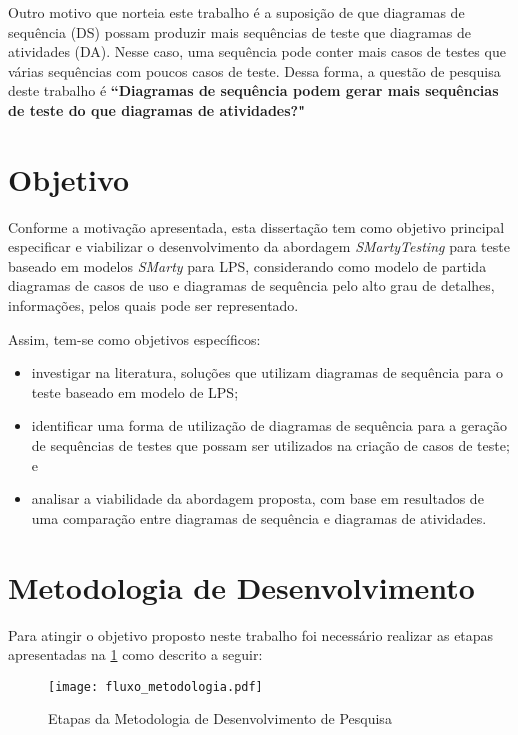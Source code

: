 Outro motivo que norteia este trabalho é a suposição de que diagramas de sequência (DS) possam produzir mais sequências de teste que diagramas de atividades (DA).  Nesse caso, uma sequência pode conter mais casos de testes que várias sequências com poucos casos de teste. Dessa forma, a questão de pesquisa deste trabalho é \textbf{``Diagramas de sequência podem gerar mais sequências de teste do que diagramas de atividades?"} 

\section{Objetivo}
\label{cap1sec:objetivo}

Conforme a motivação apresentada, esta dissertação tem como objetivo principal especificar e viabilizar o desenvolvimento da abordagem \textit{SMartyTesting} para teste baseado em modelos \textit{SMarty} para LPS, considerando como modelo de partida diagramas de casos de uso e diagramas de sequência pelo alto grau de detalhes, informações, pelos quais pode ser representado. 


Assim, tem-se como objetivos específicos:
\begin{itemize}
	\item investigar na literatura, soluções que utilizam diagramas de sequência para o teste baseado em modelo de LPS;
	\item identificar uma forma de utilização de diagramas de sequência para a geração de sequências de testes que possam ser utilizados na criação de casos de teste; e
	\item analisar a viabilidade da abordagem proposta, com base em resultados de uma comparação entre diagramas de sequência e diagramas de atividades.
\end{itemize} 


\section{Metodologia de Desenvolvimento}
\label{cap1sec:metodo_desenv}


Para atingir o objetivo proposto neste trabalho foi necessário realizar as etapas apresentadas na \ref{fig:fluxometodo} como descrito a seguir:

\begin{figure}[h!]
	\centering
	\texttt{[image: fluxo\_metodologia.pdf]}
	\caption{Etapas da Metodologia de Desenvolvimento de Pesquisa}
	\label{fig:fluxometodo}
\end{figure}

